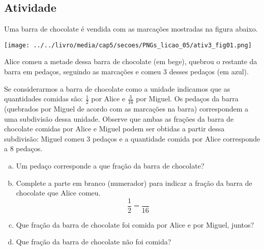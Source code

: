 \subsection{Atividade}


Uma barra de chocolate é vendida com as marcações mostradas na figura abaixo.
 \begin{center}
 \texttt{[image: ../../livro/media/cap5/secoes/PNGs\_licao\_05/ativ3\_fig01.png]}
 \end{center}
 

Alice comeu a metade dessa barra de chocolate (em bege), quebrou o restante da barra em pedaços, seguindo as marcações e comeu 3 desses pedaços (em azul).

\begin{center}
\end{center}

Se considerarmos a barra de chocolate como a unidade indicamos que as quantidades comidas são: $\frac{1}{2}$ por Alice e $\frac{3}{16}$ por Miguel.
Os pedaços da barra (quebrados por Miguel de acordo com as marcações na barra) correspondem a uma subdivisão dessa unidade.
Observe que ambas as frações da barra de chocolate comidas por Alice e Miguel podem ser obtidas a partir dessa subdivisão: Miguel comeu 3 pedaços e a quantidade comida por Alice corresponde a 8 pedaços.
\begin{enumerate}[a)]
\item Um pedaço corresponde a que fração da barra de chocolate?
\item Complete a parte em branco (numerador) para indicar a fração da barra de chocolate que Alice comeu. $$\frac{1}{2} = \frac{ }{16}$$ 
\item Que fração da barra de chocolate foi comida por Alice e por Miguel, juntos?
\item  Que fração da barra de chocolate não foi comida?
\end{enumerate}

